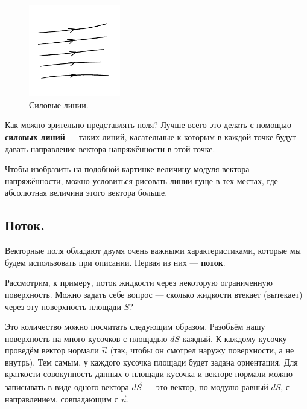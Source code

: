 \documentclass[11pt,a4paper]{article}
\numberwithin{equation}{section}
\begin{document}
\begin{figure}
  \vspace{-1cm}
  \begin{center}
  \includegraphics[width=4cm]{lines.pdf}  
  \end{center}
  \vspace{-1cm}
  \caption{Силовые линии.}
  \label{fig:force_lines}
  \vspace{-1.1cm}
\end{figure}

Как можно зрительно представлять поля? Лучше всего это делать с
помощью \textbf{силовых линий} --- таких линий, касательные к которым в
каждой точке будут давать направление вектора напряжённости в этой
точке. 

Чтобы изобразить на подобной картинке величину модуля вектора
напряжённости, можно условиться рисовать линии гуще в тех местах, где
абсолютная величина этого вектора больше. 

\subsection{Поток.}
\label{sec:flux}

Векторные поля обладают двумя очень важными характеристиками, которые
мы будем использовать при описании. Первая из них --- \textbf{поток}. 

Рассмотрим, к примеру, поток жидкости через некоторую ограниченную
поверхность. Можно задать себе вопрос --- сколько жидкости втекает
(вытекает) через эту поверхность площади $S$? 

Это количество можно посчитать следующим образом. Разобъём нашу
поверхность на много кусочков с площадью $dS$ каждый. К каждому
кусочку проведём вектор нормали $\vec{n}$ (так, чтобы он смотрел
наружу поверхности, а не внутрь). Тем самым, у каждого кусочка площади
будет задана ориентация. Для краткости совокупность данных о площади
кусочка и векторе нормали можно записывать в виде одного вектора
$d\vec{S}$ --- это вектор, по модулю равный $dS$, с направлением,
совпадающим с $\vec{n}$.
\end{document}
